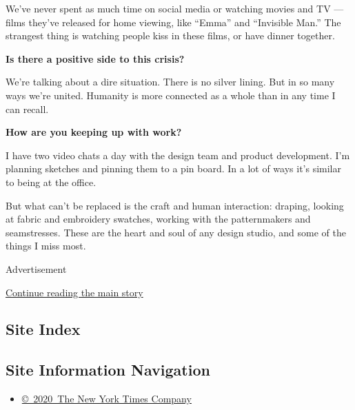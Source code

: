 We've never spent as much time on social media or watching movies and TV
--- films they've released for home viewing, like ``Emma'' and
``Invisible Man.'' The strangest thing is watching people kiss in these
films, or have dinner together.

\textbf{Is there a positive side to this crisis?}

We're talking about a dire situation. There is no silver lining. But in
so many ways we're united. Humanity is more connected as a whole than in
any time I can recall.

\textbf{How are you keeping up with work?}

I have two video chats a day with the design team and product
development. I'm planning sketches and pinning them to a pin board. In a
lot of ways it's similar to being at the office.

But what can't be replaced is the craft and human interaction: draping,
looking at fabric and embroidery swatches, working with the
patternmakers and seamstresses. These are the heart and soul of any
design studio, and some of the things I miss most.

Advertisement

\protect\hyperlink{after-bottom}{Continue reading the main story}

\hypertarget{site-index}{%
\subsection{Site Index}\label{site-index}}

\hypertarget{site-information-navigation}{%
\subsection{Site Information
Navigation}\label{site-information-navigation}}

\begin{itemize}
\tightlist
\item
  \href{https://help.nytimes.com/hc/en-us/articles/115014792127-Copyright-notice}{©~2020~The
  New York Times Company}
\end{itemize}

